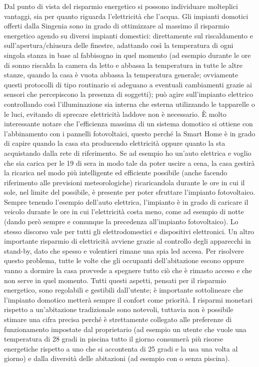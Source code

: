 Dal punto di vista del risparmio energetico si possono individuare molteplici vantaggi, sia per quanto riguarda l’elettricità che l’acqua. Gli impianti domotici offerti dalla Singenia sono in grado di ottimizzare al massimo il risparmio energetico agendo su diversi impianti domestici: direttamente sul riscaldamento e sull’apertura/chiusura delle finestre, adattando così la temperatura di ogni singola stanza in base al fabbisogno in quel momento (ad esempio durante le ore di sonno riscalda la camera da letto e abbassa la temperatura in tutte le altre stanze, quando la casa è vuota abbassa la temperatura generale; ovviamente questi protocolli di tipo routinario si adeguano a eventuali cambiamenti grazie ai sensori che percepiscono la presenza di soggetti); può agire sull’impianto elettrico controllando così l’illuminazione sia interna che esterna utilizzando le tapparelle o le luci, evitando di sprecare elettricità laddove non è necessario. 
È molto interessante notare che l’efficienza massima di un sistema domotico si ottiene con l’abbinamento con i pannelli fotovoltaici, questo perché la Smart Home è in grado di capire quando la casa sta producendo elettricità oppure quanto la sta acquistando dalla rete di riferimento. Se ad esempio ho un’auto elettrica e voglio che sia carica per le 19 di sera in modo tale da poter uscire a cena, la casa gestirà la ricarica nel modo più intelligente ed efficiente possibile (anche facendo riferimento alle previsioni meteorologiche) ricaricandola durante le ore in cui il sole, nel limite del possibile, è presente per poter sfruttare l’impianto fotovoltaico. Sempre tenendo l’esempio dell’auto elettrica, l’impianto è in grado di caricare il veicolo durante le ore in cui l’elettricità costa meno, come ad esempio di notte (dando però sempre e comunque la precedenza all’impianto fotovoltaico). Lo stesso discorso vale per tutti gli elettrodomestici e dispositivi elettronici. Un altro importante risparmio di elettricità avviene grazie al controllo degli apparecchi in stand-by, dato che spesso e volentieri rimane una spia led accesa. Per risolvere questo problema, tutte le volte che gli occupanti dell’abitazione escono oppure vanno a dormire la casa provvede a spegnere tutto ciò che è rimasto acceso e che non serve in quel momento. Tutti questi aspetti, pensati per il risparmio energetico, sono regolabili e gestibili dall’utente; è importante sottolineare che l’impianto domotico metterà sempre il confort come priorità.
I risparmi monetari rispetto a un’abitazione tradizionale sono notevoli, tuttavia non è possibile stimare una cifra precisa perché è strettamente collegato alle preferenze di funzionamento impostate dal proprietario (ad esempio un utente che vuole una temperatura di 28 gradi in piscina tutto il giorno consumerà più risorse energetiche rispetto a uno che si accontenta di 25 gradi e la usa una volta al giorno) e dalla diversità delle abitazioni (ad esempio con o senza piscina).
